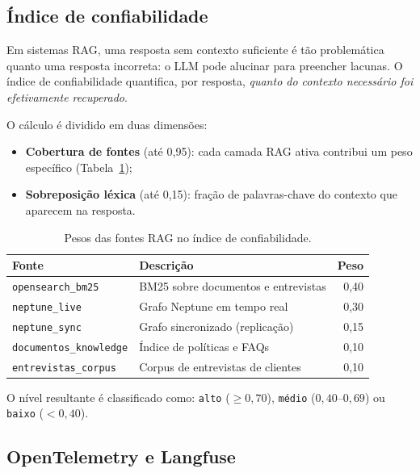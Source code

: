 \subsection{\'Indice de confiabilidade}
\label{sec:indice_confiabilidade}

Em sistemas RAG, uma resposta sem contexto suficiente \'e t\~ao
problem\'atica quanto uma resposta incorreta: o LLM pode alucinar
para preencher lacunas. O \'indice de
confiabilidade
quantifica, por resposta, \textit{quanto do contexto necess\'ario
foi efetivamente recuperado}.

O c\'alculo \'e dividido em duas dimens\~oes:

\begin{itemize}[leftmargin=*]
  \item \textbf{Cobertura de fontes} (at\'e 0{,}95): cada camada RAG
        ativa contribui um peso espec\'ifico (Tabela~\ref{tab:pesos_fontes});
  \item \textbf{Sobreposi\c{c}\~ao l\'exica} (at\'e 0{,}15):
        fra\c{c}\~ao de palavras-chave do contexto que aparecem na
        resposta.
\end{itemize}

\begin{table}[htbp]
\centering
\caption{Pesos das fontes RAG no \'indice de confiabilidade.}
\label{tab:pesos_fontes}
\begin{tabular}{llr}
\toprule
\textbf{Fonte} & \textbf{Descri\c{c}\~ao} & \textbf{Peso} \\
\midrule
\texttt{opensearch\_bm25}    & BM25 sobre documentos e entrevistas & 0{,}40 \\
\texttt{neptune\_live}       & Grafo Neptune em tempo real          & 0{,}30 \\
\texttt{neptune\_sync}       & Grafo sincronizado (replica\c{c}\~ao) & 0{,}15 \\
\texttt{documentos\_knowledge} & \'Indice de pol\'iticas e FAQs     & 0{,}10 \\
\texttt{entrevistas\_corpus}  & Corpus de entrevistas de clientes   & 0{,}10 \\
\bottomrule
\end{tabular}
\end{table}

O n\'ivel resultante \'e classificado como: \texttt{alto}
($\geq 0{,}70$), \texttt{m\'edio} ($0{,}40$--$0{,}69$) ou
\texttt{baixo} ($< 0{,}40$).

\subsection{OpenTelemetry e Langfuse}

